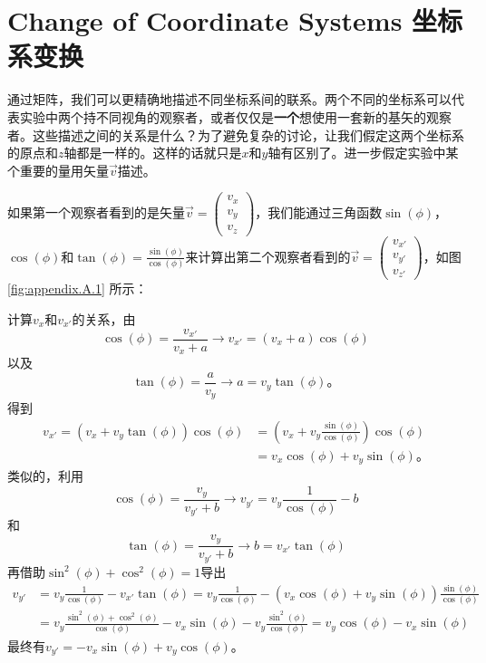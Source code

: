 \section[坐标系变换]{Change of Coordinate Systems 坐标系变换}\label{appendix.A.2}
通过矩阵，我们可以更精确地描述不同坐标系间的联系。两个不同的坐标系可以代表实验中两个持不同视角的观察者，或者仅仅是{\bfseries 一个}想使用一套新的基矢的观察者。这些描述之间的关系是什么？为了避免复杂的讨论，让我们假定这两个坐标系的原点和$z$轴都是一样的。这样的话就只是$x$和$y$轴有区别了。进一步假定实验中某个重要的量用矢量$\vec{v}$描述。

如果第一个观察者看到的是矢量$\vec{v}= \begin{pmatrix}
v_x \\ v_y \\ v_z
\end{pmatrix}$，我们能通过三角函数$\sin(\phi)$，$\cos(\phi)$和$\tan(\phi)=\frac{\sin(\phi)}{\cos(\phi)}$来计算出第二个观察者看到的$\vec{v}= \begin{pmatrix}
v_{x'} \\ v_{y'} \\ v_{z'}
\end{pmatrix}$，如图\ref{fig:appendix.A.1} 所示：

计算$v_x$和$v_{x'}$的关系，由
\[
\cos(\phi)=\frac{v_{x'}}{v_x+a} \rightarrow v_{x'}=(v_x+a)\cos(\phi)
\]
以及
\[
\tan(\phi)=\frac{a}{v_y}\rightarrow a=v_y\tan(\phi)\text{。}
\]
得到
\[
\begin{aligned}
v_{x'}=(v_x+v_y\tan(\phi))\cos(\phi)&=\left(v_x+v_y\frac{\sin(\phi)}{\cos(\phi)}\right)\cos(\phi) \\
 & = v_x\cos(\phi)+v_y\sin(\phi)\text{。}
\end{aligned}
\]
类似的，利用
\[
\cos(\phi) = \frac{v_y}{v_{y'}+b}\rightarrow v_{y'}=v_y\frac{1}{\cos(\phi)}-b
\]
和
\[
\tan(\phi)=\frac{v_y}{v_{y'}+b}\rightarrow b=v_{x'}\tan(\phi)
\]
再借助$\sin^2(\phi)+\cos^2(\phi)=1$导出
\[\begin{split}
v_{y'}&=v_y\frac{1}{\cos(\phi)}-v_{x'}\tan(\phi)=v_y\frac{1}{\cos(\phi)}-(v_x\cos(\phi)+v_y\sin(\phi))\frac{\sin(\phi)}{\cos(\phi)}  \\
&= v_y\frac{\sin^2(\phi)+\cos^2(\phi)}{\cos(\phi)}-v_x\sin(\phi)-v_y\frac{\sin^2(\phi)}{\cos(\phi)} = v_y\cos(\phi)-v_x\sin(\phi)
\end{split}\]
最终有$v_{y'}=-v_x\sin(\phi)+v_y\cos(\phi)$。

